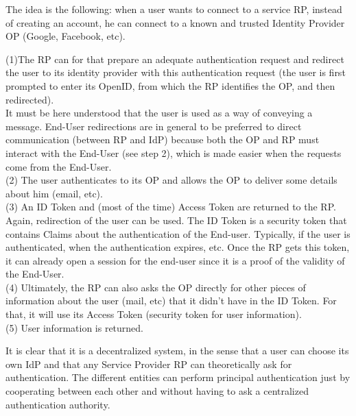 The idea is the following: when a user wants to connect to a service RP, instead of creating an account, he can connect to a known and trusted Identity Provider OP (Google, Facebook, etc). 

(1)The RP can for that prepare an adequate authentication request and redirect the user to its identity provider with this authentication request (the user is first prompted to enter its OpenID, from which the RP identifies the OP, and then redirected). 
\\It must be here understood that the user is used as a way of conveying a message. End-User redirections are in general to be preferred to direct communication (between RP and IdP) because both the OP and RP must interact with the End-User (see step 2), which is made easier when the requests come from the End-User.
\\(2) The user authenticates to its OP and allows the OP to deliver some details about him (email, etc).
\\(3) An ID Token and (most of the time) Access Token are returned to the RP. Again, redirection of the user can be used. The ID Token is a security token that contains Claims about the authentication of the End-user. Typically, if the user is authenticated, when the authentication expires, etc. Once the RP gets this token, it can already open a session for the end-user since it is a proof of the validity of the End-User.
\\(4) Ultimately, the RP can also asks the OP directly for other pieces of information about the user (mail, etc) that it didn't have in the ID Token. For that, it will use its Access Token (security token for user information).
\\(5) User information is returned.


It is clear that it is a decentralized system, in the sense that a user can choose its own IdP and that any Service Provider RP can theoretically ask for authentication. The different entities can perform principal authentication just by cooperating between each other and without having to ask a centralized authentication authority. 

